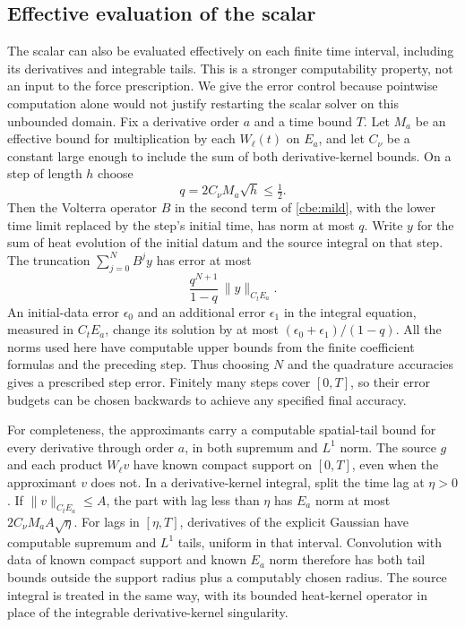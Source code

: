 \subsection{Effective evaluation of the scalar}
\label{cbe:scalar-effective}

The scalar can also be evaluated effectively on each finite time
interval, including its derivatives and integrable tails. This is a
stronger computability property, not an input to the force prescription.
We give the error control because pointwise computation alone would
not justify restarting the scalar solver on this unbounded domain.
Fix a derivative
order $a$ and a time bound $T$. Let $M_a$ be an effective bound for
multiplication by each $W_\ell(t)$ on $E_a$, and let $C_\nu$ be a
constant large enough to include the sum of both derivative-kernel
bounds. On a step of length $h$ choose
\[
 q=2C_\nu M_a\sqrt h\le\tfrac12.
\]
Then the Volterra operator $B$ in the second term of
\eqref{cbe:mild}, with the lower time limit replaced by the step's
initial time, has norm at most $q$. Write $y$ for the sum of heat
evolution of the initial datum and the source integral on that step.
The truncation $\sum_{j=0}^N B^j y$ has error at most
\[
 \frac{q^{N+1}}{1-q}\,\|y\|_{C_tE_a}.
\]
An initial-data error $\epsilon_0$ and an additional error
$\epsilon_1$ in the integral equation, measured in $C_tE_a$, change
its solution by at most $(\epsilon_0+\epsilon_1)/(1-q)$.
All the norms used here have computable upper bounds from the finite
coefficient formulas and the preceding step. Thus choosing $N$ and
the quadrature accuracies gives a prescribed step error. Finitely
many steps cover $[0,T]$, so their error budgets can be chosen
backwards to achieve any specified final accuracy.

For completeness, the approximants carry a computable spatial-tail
bound for every derivative through order $a$, in both supremum and
$L^1$ norm. The source $g$ and each product $W_\ell v$ have known
compact support on $[0,T]$, even when the approximant $v$ does not.
In a derivative-kernel integral, split the time lag at $\eta>0$.
If $\|v\|_{C_tE_a}\le A$, the part with lag less than $\eta$ has
$E_a$ norm at most $2C_\nu M_a A\sqrt\eta$.
For lags in $[\eta,T]$, derivatives of the explicit Gaussian have
computable supremum and $L^1$ tails, uniform in that interval.
Convolution with data of known compact support and known $E_a$ norm
therefore has both tail bounds outside the support radius plus a
computably chosen radius. The source integral is treated in the
same way, with its bounded heat-kernel operator in place of the
integrable derivative-kernel singularity.

